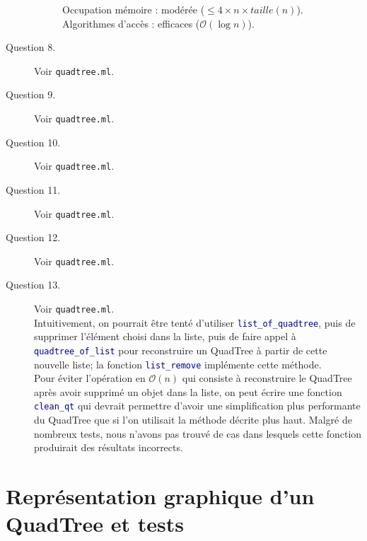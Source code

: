\documentclass[11pt]{scrartcl}
\newcommand{\funname}[1]{\texttt{\textcolor{darkblue}{#1}}}
\newcommand{\filename}[1]{\texttt{\textcolor{darkbrown}{#1}}}
\begin{document}
\begin{description}
\begin{description}
Occupation mémoire : modérée ($\leq 4 \times n \times taille(n)$).\\
Algorithmes d'accès : efficaces ($\mathcal{O}(\log{}n)$).
\end{description}
\item[Question 8.] Voir \filename{quadtree.ml}.

\item[Question 9.] Voir \filename{quadtree.ml}.

\item[Question 10.] Voir \filename{quadtree.ml}.

\item[Question 11.] Voir \filename{quadtree.ml}.

\item[Question 12.] Voir \filename{quadtree.ml}.

\item[Question 13.] Voir \filename{quadtree.ml}.\\
Intuitivement, on pourrait être tenté d'utiliser \funname{list_of_quadtree}, puis de supprimer l'élément choisi dans la liste, puis de faire appel à \funname{quadtree_of_list} pour reconstruire un QuadTree à partir de cette nouvelle liste; la fonction \funname{list_remove} implémente cette méthode.\\
Pour éviter l'opération en $\mathcal{O}(n)$ qui consiste à reconstruire le QuadTree après avoir supprimé un objet dans la liste, on peut écrire une fonction \funname{clean_qt} qui devrait permettre d'avoir une simplification plus performante du QuadTree que si l'on utilisait la méthode décrite plus haut. Malgré de nombreux tests, nous n'avons pas trouvé de cas dans lesquels cette fonction produirait des résultats incorrects.
\end{description}

\section{Représentation graphique d'un QuadTree et tests}
\end{document}
